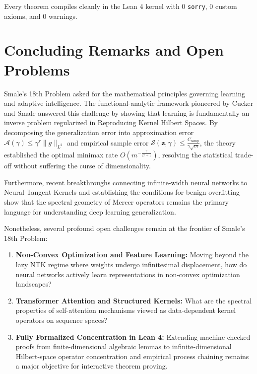 \documentclass[11pt,a4paper]{article}
\theoremstyle{definition}
\begin{document}
Every theorem compiles cleanly in the Lean 4 kernel with 0 \texttt{sorry}, 0 custom axioms, and 0 warnings.

\section{Concluding Remarks and Open Problems}\label{sec:conclusions}

Smale's 18th Problem asked for the mathematical principles governing learning and adaptive intelligence. The functional-analytic framework pioneered by Cucker and Smale \cite{cucker2002} answered this challenge by showing that learning is fundamentally an inverse problem regularized in Reproducing Kernel Hilbert Spaces.
By decomposing the generalization error into approximation error $\mathcal{A}(\gamma) \le \gamma^r \|g\|_{L^2}$ and empirical sample error $\mathcal{S}(\mathbf{z}, \gamma) \le \frac{C_{\text{samp}}}{\gamma \sqrt{m}}$, the theory established the optimal minimax rate $O(m^{-\frac{r}{2r+1}})$, resolving the statistical trade-off without suffering the curse of dimensionality.

Furthermore, recent breakthroughs connecting infinite-width neural networks to Neural Tangent Kernels \cite{jacot2018} and establishing the conditions for benign overfitting \cite{bartlett2020} show that the spectral geometry of Mercer operators remains the primary language for understanding deep learning generalization.

Nonetheless, several profound open challenges remain at the frontier of Smale's 18th Problem:
\begin{enumerate}
    \item \textbf{Non-Convex Optimization and Feature Learning:} Moving beyond the lazy NTK regime where weights undergo infinitesimal displacement, how do neural networks actively learn representations in non-convex optimization landscapes?
    \item \textbf{Transformer Attention and Structured Kernels:} What are the spectral properties of self-attention mechanisms viewed as data-dependent kernel operators on sequence spaces?
    \item \textbf{Fully Formalized Concentration in Lean 4:} Extending machine-checked proofs from finite-dimensional algebraic lemmas to infinite-dimensional Hilbert-space operator concentration and empirical process chaining remains a major objective for interactive theorem proving.
\end{enumerate}
\end{document}
